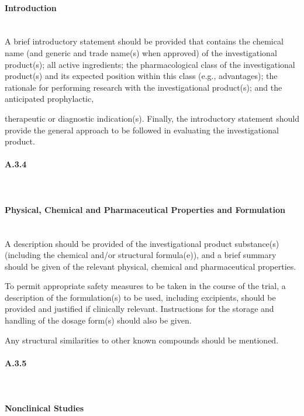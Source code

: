 \documentclass[11pt]{article}
\begin{document}
\paragraph{Introduction}\mbox{}\\

A brief introductory statement should be provided that contains the chemical name (and generic and trade name(s) when approved) of the investigational product(s); all active ingredients; the pharmacological class of the investigational product(s) and its expected position within this class (e.g., advantages); the rationale for performing research with the investigational product(s); and the anticipated prophylactic,


therapeutic or diagnostic indication(s). Finally, the introductory statement should provide the general approach to be followed in evaluating the investigational product.


\paragraph{A.3.4}\mbox{}\\

\paragraph{Physical, Chemical and Pharmaceutical Properties and Formulation}\mbox{}\\

A description should be provided of the investigational product substance(s) (including the chemical and/or structural formula(e)), and a brief summary should be given of the relevant physical, chemical and pharmaceutical properties.


To permit appropriate safety measures to be taken in the course of the trial, a description of the formulation(s) to be used, including excipients, should be provided and justified if clinically relevant. Instructions for the storage and handling of the dosage form(s) should also be given.


Any structural similarities to other known compounds should be mentioned.


\paragraph{A.3.5}\mbox{}\\

\paragraph{Nonclinical Studies}\mbox{}\\
\end{document}
